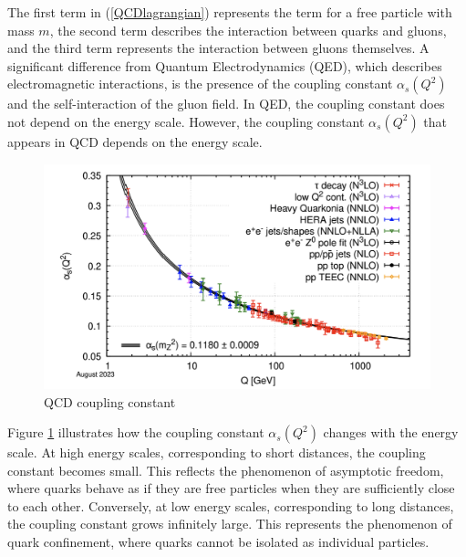         The first term in (\ref{QCDlagrangian}) represents the term for a free particle with mass $m$, the second term describes the interaction between quarks and gluons, and the third term represents the interaction between gluons themselves. A significant difference from Quantum Electrodynamics (QED), which describes electromagnetic interactions, is the presence of the coupling constant $\alpha_s(Q^2)$ and the self-interaction of the gluon field. In QED, the coupling constant does not depend on the energy scale. However, the coupling constant $\alpha_s(Q^2)$ that appears in QCD depends on the energy scale.
        \begin{figure}[htbp]
            \centering
            \includegraphics[keepaspectratio, scale=0.6]{fig/1_1_coupling_constant.png}
            \caption{QCD coupling constant\cite{ParticleDataGroup:2024cfk}}
            \label{coupling_constant}
        \end{figure}
        
        Figure \ref{coupling_constant} illustrates how the coupling constant $\alpha_s(Q^2)$ changes with the energy scale. At high energy scales, corresponding to short distances, the coupling constant becomes small. This reflects the phenomenon of asymptotic freedom, where quarks behave as if they are free particles when they are sufficiently close to each other. Conversely, at low energy scales, corresponding to long distances, the coupling constant grows infinitely large. This represents the phenomenon of quark confinement, where quarks cannot be isolated as individual particles.  
        
